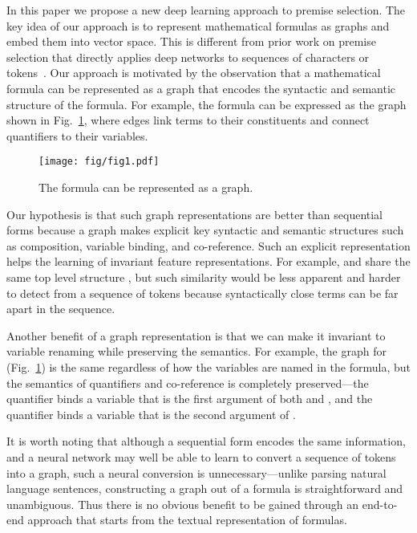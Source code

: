 \documentclass{article}
\begin{document}
In this paper we propose a new deep learning approach to premise selection. 
The key idea of our approach is to represent mathematical formulas as graphs and embed them into
vector space. This is different from prior work on premise selection that 
directly applies deep networks to sequences of characters or tokens~\cite{deepmath, holstep}. Our approach is motivated by the
observation that a mathematical formula can be represented as a graph that encodes
 the syntactic and semantic structure of the formula. For example, the
formula  can be expressed as the graph shown in
Fig.~\ref{fig1}, where edges link terms to their constituents and connect quantifiers to their
variables. 

\begin{figure}
  \centering
  \texttt{[image: fig/fig1.pdf]}\\
  \caption{The formula  can be represented as a
    graph. }\label{fig1}
     \vspace{-2mm}
\end{figure}

Our hypothesis is that such graph representations are better than sequential
forms because a graph makes explicit key syntactic and semantic structures such as
composition, variable binding, and co-reference. Such an explicit
representation helps the learning of invariant feature representations. For
example,  and 
share the same top level structure , but such similarity would be
less apparent and harder to detect from a sequence of tokens because
syntactically close terms can be far apart in the
sequence. 

Another benefit of a graph representation is that we can make it invariant to
variable renaming while preserving the semantics. For example, the graph
for  
(Fig.~\ref{fig1}) is the same regardless of how the variables are named in the formula, but the
semantics of quantifiers and co-reference is completely preserved---the quantifier  binds a variable that
is the first argument of both  and , and the quantifier  binds a variable that is the
second argument of . 

It is worth noting that although a sequential form encodes the
same information, and a neural network may well 
 be able to learn to convert a sequence of tokens into a graph, such a neural conversion is
unnecessary---unlike parsing natural language sentences, constructing a graph out of a
formula is straightforward and unambiguous. 
Thus there is no obvious benefit to be gained through an end-to-end approach that starts
from the textual representation of formulas. 
\end{document}
